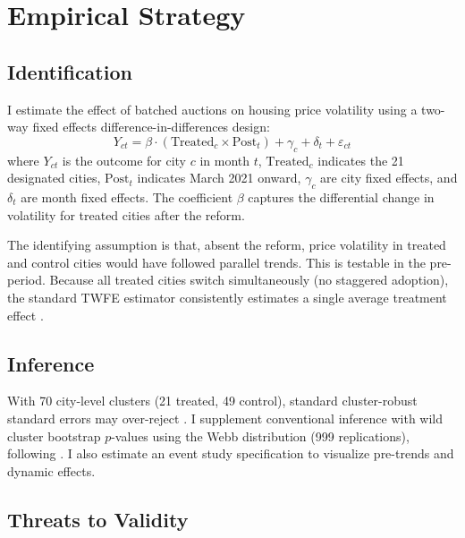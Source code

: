 \documentclass[12pt]{article}
\begin{document}


\section{Empirical Strategy}

\subsection{Identification}

I estimate the effect of batched auctions on housing price volatility using a two-way fixed effects difference-in-differences design:
\begin{equation}
Y_{ct} = \beta \cdot (\text{Treated}_c \times \text{Post}_t) + \gamma_c + \delta_t + \varepsilon_{ct}
\label{eq:main}
\end{equation}
where $Y_{ct}$ is the outcome for city $c$ in month $t$, $\text{Treated}_c$ indicates the 21 designated cities, $\text{Post}_t$ indicates March 2021 onward, $\gamma_c$ are city fixed effects, and $\delta_t$ are month fixed effects. The coefficient $\beta$ captures the differential change in volatility for treated cities after the reform.

The identifying assumption is that, absent the reform, price volatility in treated and control cities would have followed parallel trends. This is testable in the pre-period. Because all treated cities switch simultaneously (no staggered adoption), the standard TWFE estimator consistently estimates a single average treatment effect \citep{callaway2021difference}.

\subsection{Inference}

With 70 city-level clusters (21 treated, 49 control), standard cluster-robust standard errors may over-reject \citep{cameron2008bootstrap}. I supplement conventional inference with wild cluster bootstrap $p$-values using the Webb distribution (999 replications), following \citet{cameron2008bootstrap}. I also estimate an event study specification to visualize pre-trends and dynamic effects.

\subsection{Threats to Validity}
\label{sec:threats}
\end{document}
